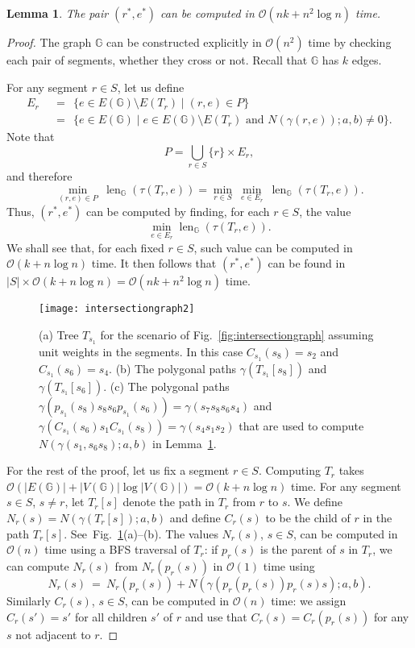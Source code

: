 \documentclass[11pt,a4paper]{article}
\newtheorem{lemma}[definition]{Lemma}
\def\I{\ensuremath{\mathbb{G}}}
\def\cycle{\ensuremath{\tau}}
\DeclareMathOperator{\lengthBIS}{len}
\newcommand\length{\lengthBIS_{\I}}
\begin{document}
\begin{lemma}\label{le:time}
	The pair $(r^*,e^*)$ can be computed in $\mathcal{O}(nk+ n^2\log n)$ time.
\end{lemma}
\begin{proof}
	The graph $\I$ can be constructed explicitly in $\mathcal{O}(n^2)$ time by checking
	each pair of segments, whether they cross or not.
	Recall that $\I$ has $k$ edges.

	For any segment $r\in S$, let us define
	\begin{align*}
		E_r ~~&=~~ \{ e\in E(\I)\setminus E(T_r)\mid (r,e)\in P\} \\
			&=~~  \{ e\in E(\I) \mid \mbox{$e\in E(\I)\setminus E(T_r)$ and 
										$N(\gamma(r,e));a,b)\not = 0$}\}. 
	\end{align*}
	Note that 
	\[
		P=\bigcup_{r\in S} \{ r\}\times E_r,
	\]
	and therefore 
	\[
		\min_{(r,e)\in P}~ \length(\cycle(T_r,e)) = 
		\min_{r\in S}~ \min_{e\in E_r}~ \length(\cycle(T_r,e)).
	\]
	Thus, $(r^*,e^*)$ can be computed by finding, for each $r\in S$,
	the value 
	\[
		\min_{e\in E_r}\length(\cycle(T_r,e)).
	\]
	We shall see that, for each fixed
	$r\in S$, such value  
	can be computed in $\mathcal{O}(k+n\log n)$ time. 
	It then follows that  $(r^*,e^*)$ can be found in 
	$|S|\times \mathcal{O}(k+n\log n)=\mathcal{O}(nk+ n^2\log n)$ time.	
	
	\begin{figure}
	\centering
		\texttt{[image: intersectiongraph2]}
		\caption{(a) Tree $T_{s_1}$ for the scenario of Fig.~\ref{fig:intersectiongraph} assuming unit weights in the segments. 
				In this case $C_{s_1}(s_8)=s_2$ and $C_{s_1}(s_6)=s_4$.
			(b) The polygonal paths $\gamma(T_{s_1}[s_8])$ and $\gamma(T_{s_1}[s_6])$.
			(c) The polygonal paths $\gamma(p_{s_1}(s_8)s_8s_6 p_{s_1}(s_6))= \gamma(s_7s_8s_6 s_4)$ 
				and $\gamma(C_{s_1}(s_6)s_1 C_{s_1}(s_8))= \gamma(s_4s_1s_2)$ that are used to compute $N(\gamma(s_1,s_6s_8);a,b)$
				in Lemma~\ref{le:time}.
			}
	\label{fig:intersectiongraph2}
	\end{figure}
	
	For the rest of the proof, let us fix a segment $r\in S$. 
	Computing $T_r$ takes $\mathcal{O}(|E(\I)| + |V(\I)|\log |V(\I)|) = \mathcal{O}(k+n\log n)$ time. 
	For any segment $s\in S$, $s\not =r$, let $T_r[s]$ denote the path in $T_r$ from $r$ 
	to $s$. We define $N_r(s)=N(\gamma(T_r[s]);a,b)$ 
	and define $C_r(s)$ to be the child of $r$ in the path $T_r[s]$.
	See~Fig.~\ref{fig:intersectiongraph2}(a)--(b).
	The values $N_r(s)$, $s\in S$, can be computed in $\mathcal{O}(n)$ 
	time using a BFS traversal of $T_r$: 
	if $p_r(s)$ is the parent of $s$ in $T_r$, we can compute $N_r(s)$
	from $N_r(p_r(s))$ in $\mathcal{O}(1)$ time using  
	\[ 
		N_r(s)~=~ N_r(p_r(s))+ N(\gamma(p_r(p_r(s))p_r(s)s) ;a,b).
	\]
	Similarly $C_r(s)$, $s\in S$, can be computed in $\mathcal{O}(n)$ time:
	we assign $C_r(s')=s'$ for all children $s'$ of $r$ and use
	that $C_r(s)=C_r(p_r(s))$ for any $s$ not adjacent to $r$.
	

\end{proof}
\end{document}
